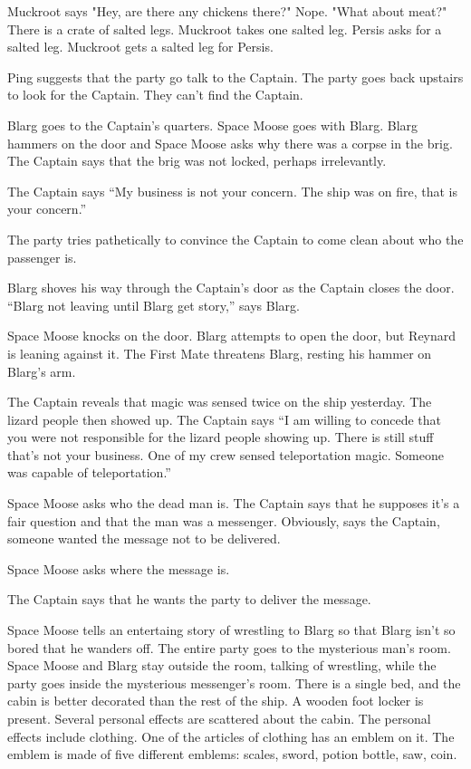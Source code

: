 \documentclass{article}
\begin{document}
Muckroot says "Hey, are there any chickens there?" Nope. "What about meat?" There is a crate of salted legs. Muckroot takes one salted leg. Persis asks for a salted leg. Muckroot gets a salted leg for Persis.

Ping suggests that the party go talk to the Captain. The party goes back upstairs to look for the Captain. They can't find the Captain.

Blarg goes to the Captain's quarters. Space Moose goes with Blarg. Blarg hammers on the door and Space Moose asks why there was a corpse in the brig. The Captain says that the brig was not locked, perhaps irrelevantly.

The Captain says ``My business is not your concern. The ship was on fire, that is your concern.''

The party tries pathetically to convince the Captain to come clean about who the passenger is. 

Blarg shoves his way through the Captain's door as the Captain closes the door. ``Blarg not leaving until Blarg get story,'' says Blarg.

Space Moose knocks on the door. Blarg attempts to open the door, but Reynard is leaning against it. The First Mate threatens Blarg, resting his hammer on Blarg's arm.

The Captain reveals that magic was sensed twice on the ship yesterday. The lizard people then showed up. The Captain says ``I am willing to concede that you were not responsible for the lizard people showing up. There is still stuff that's not your business. One of my crew sensed teleportation magic. Someone was capable of teleportation.''

Space Moose asks who the dead man is. The Captain says that he supposes it's a fair question and that the man was a messenger. Obviously, says the Captain, someone wanted the message not to be delivered.

Space Moose asks where the message is.

The Captain says that he wants the party to deliver the message.

Space Moose tells an entertaing story of wrestling to Blarg so that Blarg isn't so bored that he wanders off. The entire party goes to the mysterious man's room. Space Moose and Blarg stay outside the room, talking of wrestling, while the party goes inside the mysterious messenger's room. There is a single bed, and the cabin is better decorated than the rest of the ship. A wooden foot locker is present. Several personal effects are scattered about the cabin. The personal effects include clothing. One of the articles of clothing has an emblem on it. The emblem is made of five different emblems: scales, sword, potion bottle, saw, coin.
\end{document}
